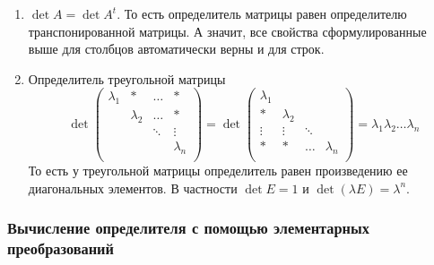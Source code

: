 \documentclass{article}
\begin{document}
\begin{enumerate}
	\item $\det A = \det A^t$. То есть определитель матрицы равен определителю транспонированной матрицы. А значит, все свойства сформулированные выше для столбцов автоматически верны и для строк.
	
	\item Определитель треугольной матрицы
	\[
	\det
	\begin{pmatrix}
		{\lambda_1}&{*}&{\ldots}&{*}\\
		{}&{\lambda_2}&{\ldots}&{*}\\
		{}&{}&{\ddots}&{\vdots}\\
		{}&{}&{}&{\lambda_n}\\
	\end{pmatrix}
	=
	\det
	\begin{pmatrix}
		{\lambda_1}&{}&{}&{}\\
		{*}&{\lambda_2}&{}&{}\\
		{\vdots}&{\vdots}&{\ddots}&{}\\
		{*}&{*}&{\ldots}&{\lambda_n}\\
	\end{pmatrix}
	=
	\lambda_1\lambda_2 \ldots \lambda_n
	\]
	То есть у треугольной матрицы определитель равен произведению ее диагональных элементов. В частности $\det E = 1$ и $\det(\lambda E) = \lambda^n$.
\end{enumerate}

\subsubsection*{Вычисление определителя с помощью элементарных преобразований}
\end{document}
